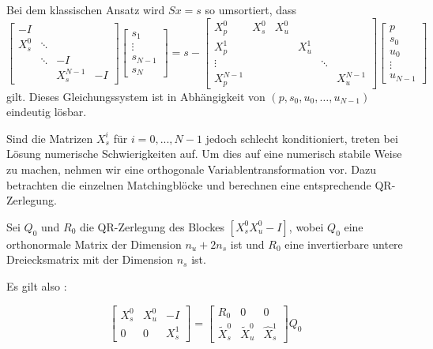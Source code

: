 Bei dem klassischen Ansatz wird $Sx=s$ so umsortiert, dass 
$$\left[\begin{array}{cccc}
-I &  &  &  \\ 
X_s^0 & \ddots &  &  \\ 
 & \ddots & -I &  \\ 
 &  & X_s^{N-1} & -I
\end{array} \right]\left[\begin{array}{c}
s_1 \\ 
\vdots \\ 
s_{N-1} \\ 
s_{N}
\end{array}  \right]=s-
\left[\begin{array}{cccccc}
X_p^0 & X_s^0 & X_u^0 &  &  &  \\ 
X_p^1 &  &  & X_u^1 &  &  \\ 
\vdots &  &  &  & \ddots &  \\ 
X_p^{N-1} &  &  &  &  & X_u^{N-1}
\end{array} 
\right]
\left[\begin{array}{c}
p \\
s_ 0 \\
u_0\\
\vdots \\
u_{N-1}
\end{array}\right]$$ 
gilt. Dieses Gleichungssystem ist in Abhängigkeit von $(p,s_0,u_0,\hdots, u_{N-1})$ eindeutig lösbar.

Sind die Matrizen $X_s^i$ für $i=0,...,N-1$ jedoch schlecht konditioniert, treten bei Lösung numerische Schwierigkeiten auf.
Um dies auf eine numerisch stabile Weise zu machen, nehmen wir eine orthogonale Variablentransformation vor. Dazu betrachten die einzelnen Matchingblöcke und berechnen eine entsprechende QR-Zerlegung. 

Sei $Q_0$ und $R_0$ die QR-Zerlegung des Blockes $[X_s^0 X_u^0 -I]$, wobei $Q_0$ eine orthonormale Matrix der Dimension $n_u+2n_s$ ist und $R_0$ eine invertierbare untere Dreiecksmatrix mit der Dimension $n_s$ ist.

Es gilt also :

$$\left[ \begin{array}{ccc}
X_s^0 &  X_u^0 & -I \\ 
0 & 0 & X_s^1
\end{array}\right]
= \left[ 
\begin{array}{ccc} 
R_0 & 0 & 0 \\
\tilde{X}^0_s & \tilde{X}^0_u & \hat{X}^1_s 
\end{array}\right]Q_0$$


